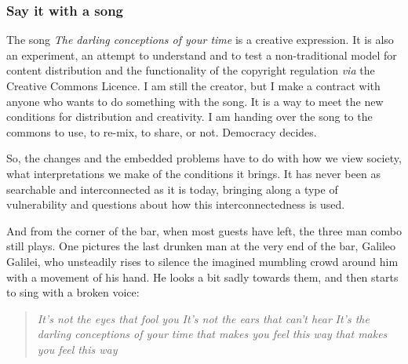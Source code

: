 \subsubsection{Say it with a song}
\label{sss:darling_conceptions:darling_conceptions:conclusions:song}

The song \textit{The darling conceptions of your time} is a creative expression.
It is also an experiment, an attempt to understand and to test a non-traditional
model for content distribution and the functionality of the copyright regulation
\textit{via} the Creative Commons Licence. I am still the creator, but I make a
contract with anyone who wants to do something with the song. It is a way to
meet the new conditions for distribution and creativity. I am handing over the
song to the commons to use, to re-mix, to share, or not. Democracy decides. 

So, the changes and the embedded problems have to do with how we view society,
what interpretations we make of the conditions it brings. It has never been as
searchable and interconnected as it is today, bringing along a type of
vulnerability and questions about how this interconnectedness is used. 

And from the corner of the bar, when most guests have left, the three man combo
still plays. One pictures the last drunken man at the very end of the bar,
Galileo Galilei, who unsteadily rises to silence the imagined mumbling crowd
around him with a movement of his hand. He looks a bit sadly towards them, and
then starts to sing with a broken voice: 

\begin{quote}
\textit{It's not the eyes that fool you}\newline
\textit{It's not the ears that can't hear}\newline
\textit{It's the darling conceptions of your time}\newline
\textit{that makes you feel this way}\newline
\textit{that makes you feel this way}
\end{quote}

